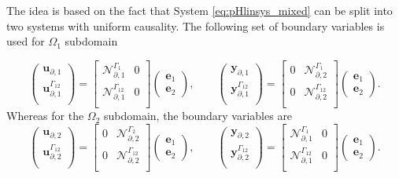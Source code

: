 The idea is based on the fact that System \ref{eq:pHlinsys_mixed} can be split into two systems with uniform causality.  The following set of boundary variables is used for $\Omega_1$ subdomain

\begin{equation} \label{eq:bc_Om1} 
\begin{pmatrix}
\bm{u}_{\partial, 1}\\
\bm{u}_{\partial, 1}^{\Gamma_{12}}\\
\end{pmatrix} = \begin{bmatrix}
\mathcal{N}_{\partial, 1}^{\Gamma_1} & 0\\
\mathcal{N}_{\partial, 1}^{\Gamma_{12}} & 0 \\
\end{bmatrix} \begin{pmatrix}
\bm{e}_1 \\ \bm{e}_2
\end{pmatrix}, \qquad
\begin{pmatrix}
\bm{y}_{\partial, 1}\\
\bm{y}_{\partial, 1}^{\Gamma_{12}} \\
\end{pmatrix} = \begin{bmatrix}
0 & \mathcal{N}_{\partial, 2}^{\Gamma_1} \\
0 & \mathcal{N}_{\partial, 2}^{\Gamma_{12}} \\
\end{bmatrix} \begin{pmatrix}
\bm{e}_1 \\ \bm{e}_2
\end{pmatrix}.
\end{equation}
Whereas for the $\Omega_2$ subdomain, the boundary variables are
\begin{equation} \label{eq:bc_Om2}
\begin{pmatrix}
\bm{u}_{\partial, 2}\\
\bm{u}_{\partial, 2}^{\Gamma_{12}}\\
\end{pmatrix} = \begin{bmatrix}
0 & \mathcal{N}_{\partial, 2}^{\Gamma_2}\\
0 & \mathcal{N}_{\partial, 2}^{\Gamma_{12}} \\
\end{bmatrix} \begin{pmatrix}
\bm{e}_1 \\ \bm{e}_2
\end{pmatrix}, \qquad
\begin{pmatrix}
\bm{y}_{\partial, 2}\\
\bm{y}_{\partial, 2}^{\Gamma_{12}}\\
\end{pmatrix} = \begin{bmatrix}
\mathcal{N}_{\partial, 1}^{\Gamma_1} & 0 \\
\mathcal{N}_{\partial, 1}^{\Gamma_{12}}  & 0 \\
\end{bmatrix} \begin{pmatrix}
\bm{e}_1 \\ \bm{e}_2
\end{pmatrix}.
\end{equation}
